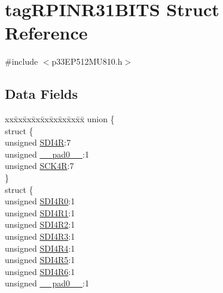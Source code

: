 \hypertarget{structtag_r_p_i_n_r31_b_i_t_s}{}\section{tag\+R\+P\+I\+N\+R31\+B\+I\+TS Struct Reference}
\label{structtag_r_p_i_n_r31_b_i_t_s}


{\ttfamily \#include $<$p33\+E\+P512\+M\+U810.\+h$>$}

\subsection*{Data Fields}
\begin{DoxyCompactItemize}
\item 
\begin{tabbing}
xx\=xx\=xx\=xx\=xx\=xx\=xx\=xx\=xx\=\kill
union \{\\
\>struct \{\\
\>\>unsigned \hyperlink{structtag_r_p_i_n_r31_b_i_t_s_ae5dcae11ba80f260aba36d069c033c6a}{SDI4R}:7\\
\>\>unsigned \hyperlink{structtag_r_p_i_n_r31_b_i_t_s_adf71f3d8410c1f1dbbc96680a92c49af}{\_\_pad0\_\_}:1\\
\>\>unsigned \hyperlink{structtag_r_p_i_n_r31_b_i_t_s_ad8cb64768a083db2936aaebdb6917c67}{SCK4R}:7\\
\>\} \\
\>struct \{\\
\>\>unsigned \hyperlink{structtag_r_p_i_n_r31_b_i_t_s_a5061ebea33ab9373318eddbecb5599f5}{SDI4R0}:1\\
\>\>unsigned \hyperlink{structtag_r_p_i_n_r31_b_i_t_s_a4e74f0495abf635ef4032a06a1b7ae5d}{SDI4R1}:1\\
\>\>unsigned \hyperlink{structtag_r_p_i_n_r31_b_i_t_s_a35dbdb4e417eecd803802dba69100dd6}{SDI4R2}:1\\
\>\>unsigned \hyperlink{structtag_r_p_i_n_r31_b_i_t_s_a377537c0a6c6037ffb9e7a437eecd975}{SDI4R3}:1\\
\>\>unsigned \hyperlink{structtag_r_p_i_n_r31_b_i_t_s_ad514ff70c64fc00dc22e17f1bc0013d8}{SDI4R4}:1\\
\>\>unsigned \hyperlink{structtag_r_p_i_n_r31_b_i_t_s_a24543ce11b0dec1c497ccc7200b8e306}{SDI4R5}:1\\
\>\>unsigned \hyperlink{structtag_r_p_i_n_r31_b_i_t_s_aa38e2536303a8eeaef20ff248c90d642}{SDI4R6}:1\\
\>\>unsigned \hyperlink{structtag_r_p_i_n_r31_b_i_t_s_adf71f3d8410c1f1dbbc96680a92c49af}{\_\_pad0\_\_}:1\\

\end{tabbing}
\end{DoxyCompactItemize}
